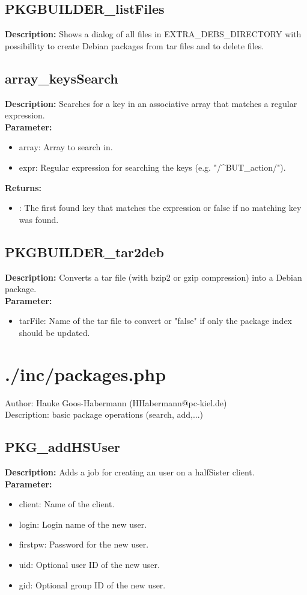 \subsection{PKGBUILDER\_listFiles}
\textbf{Description:} Shows a dialog of all files in EXTRA\_DEBS\_DIRECTORY with possibillity to create Debian packages from tar files and to delete files.\\

\subsection{array\_keysSearch}
\textbf{Description:} Searches for a key in an associative array that matches a regular expression.\\
\textbf{Parameter:}
\begin{itemize}
\item array: Array to search in.
\item expr: Regular expression for searching the keys (e.g. "/^BUT\_action/").
\end{itemize}
\textbf{Returns:}
\begin{itemize}
\item : The first found key that matches the expression or false if no matching key was found.
\end{itemize}

\subsection{PKGBUILDER\_tar2deb}
\textbf{Description:} Converts a tar file (with bzip2 or gzip compression) into a Debian package.\\
\textbf{Parameter:}
\begin{itemize}
\item tarFile: Name of the tar file to convert or "false" if only the package index should be updated.
\end{itemize}

\newpage\section{./inc/packages.php}
Author: Hauke Goos-Habermann (HHabermann@pc-kiel.de)\\
Description: basic package operations (search, add,...)\\

\subsection{PKG\_addHSUser}
\textbf{Description:} Adds a job for creating an user on a halfSister client.\\
\textbf{Parameter:}
\begin{itemize}
\item client: Name of the client.
\item login: Login name of the new user.
\item firstpw: Password for the new user.
\item uid: Optional user ID of the new user.
\item gid: Optional group ID of the new user.
\end{itemize}


